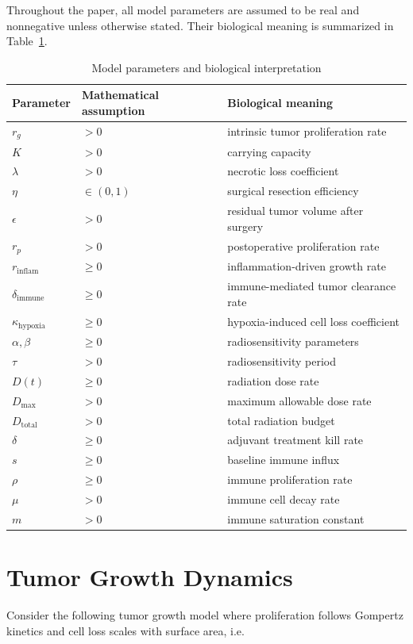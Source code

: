 \documentclass[11pt, reqno]{amsart}
\numberwithin{equation}{section}
\theoremstyle{definition}
\begin{document}
Throughout the paper, all model parameters are assumed to be real and nonnegative unless otherwise stated. Their biological meaning is summarized in Table~\ref{tab:param_meaning}.
\begin{table}[H]
\centering
\caption{Model parameters and biological interpretation}
\label{tab:param_meaning}
\begin{tabular}{lll}
\toprule
Parameter & Mathematical assumption & Biological meaning\\
\midrule
$r_g$ & $>0$ & intrinsic tumor proliferation rate\\
$K$ & $>0$ & carrying capacity\\
$\lambda$ & $>0$ & necrotic loss coefficient\\
$\eta$ & $\in(0,1)$ & surgical resection efficiency\\
$\epsilon$ & $>0$ & residual tumor volume after surgery\\
$r_p$ & $>0$ & postoperative proliferation rate\\
$r_{\mathrm{inflam}}$ & $\ge0$ & inflammation-driven growth rate\\
$\delta_{\mathrm{immune}}$ & $\ge0$ & immune-mediated tumor clearance rate\\
$\kappa_{\mathrm{hypoxia}}$ & $\ge0$ & hypoxia-induced cell loss coefficient\\
$\alpha,\beta$ & $\ge0$ & radiosensitivity parameters\\
$\tau$ & $>0$ & radiosensitivity period\\
$D(t)$ & $\ge0$ & radiation dose rate\\
$D_{\max}$ & $>0$ & maximum allowable dose rate\\
$D_{\mathrm{total}}$ & $>0$ & total radiation budget\\
$\delta$ & $\ge0$ & adjuvant treatment kill rate\\
$s$ & $\ge0$ & baseline immune influx\\
$\rho$ & $\ge0$ & immune proliferation rate\\
$\mu$ & $>0$ & immune cell decay rate\\
$m$ & $>0$ & immune saturation constant\\
\bottomrule
\end{tabular}
\end{table}



\section{Tumor Growth Dynamics}
\label{sec:growth_model}
Consider the following tumor growth model where proliferation follows Gompertz kinetics and cell loss scales with surface area, i.e.
\end{document}
